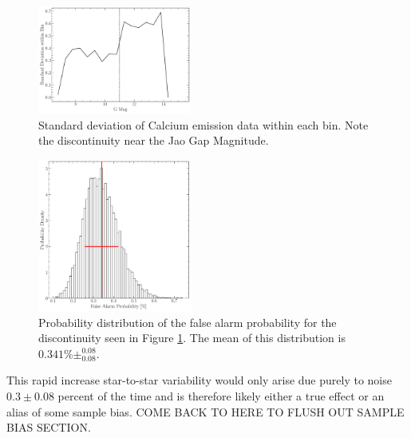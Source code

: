 \begin{figure}
  \centering
  \includegraphics[width=0.45\textwidth]{figures/Deviation.pdf}
  \caption{Standard deviation of Calcium emission data within each bin. Note
  the discontinuity near the Jao Gap Magnitude.}
  \label{fig:deviation}
\end{figure}

\begin{figure}
  \centering
  \includegraphics[width=0.45\textwidth]{figures/fpDist.pdf}
  \caption{Probability distribution of the false alarm probability for the
  discontinuity seen in Figure \ref{fig:deviation}. The mean of this
  distribution is $0.341\%\pm^{0.08}_{0.08}$.}
  \label{fig:dist}
\end{figure}

This rapid increase star-to-star variability would only arise due purely to
noise $0.3\pm0.08$ percent of the time and is therefore likely either a true
effect or an alias of some sample bias. {\color{red} COME BACK TO HERE TO FLUSH
OUT SAMPLE BIAS SECTION.}

